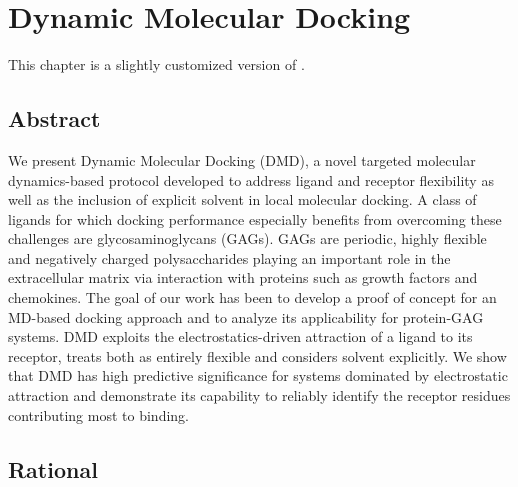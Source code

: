 \chapter{Dynamic Molecular Docking}

This chapter is a slightly customized version of
\cite{dmd_samsonov_gehrcke_2014}.


\section{Abstract}
We present Dynamic Molecular Docking (DMD), a novel
targeted molecular dy\-namics-based protocol developed to address ligand and
receptor flexibility as well as the inclusion of explicit solvent in local
molecular docking. A class of ligands for which docking performance especially
benefits from overcoming these challenges are glycosaminoglycans (GAGs). GAGs
are periodic, highly flexible and negatively charged polysaccharides playing an
important role in the extracellular matrix via interaction with proteins such as
growth factors and chemokines. The goal of our work has been to develop a proof
of concept for an MD-based docking approach and to analyze its applicability for
protein-GAG systems. DMD exploits the electrostatics-driven attraction of a
ligand to its receptor, treats both as entirely flexible and considers solvent
explicitly. We show that DMD has high predictive significance for systems
dominated by electrostatic attraction and demonstrate its capability to reliably
identify the receptor residues contributing most to binding.

\section{Rational}


